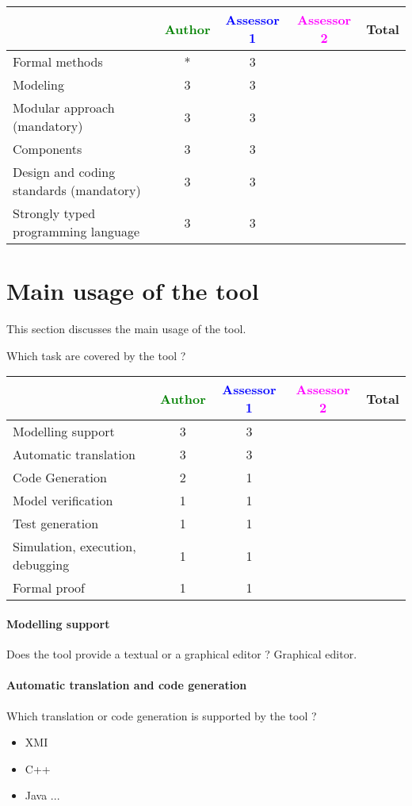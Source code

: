 \begin{tabular}{|l | c | c | c | c|}
\hline
& \textcolor{green}{Author} & \textcolor{blue}{Assessor 1} & \textcolor{magenta}{Assessor 2} & Total \\
\hline
Formal methods  &* & 3& &  \\
\hline 
Modeling  &3 & 3& &  \\
\hline
Modular approach (mandatory) &3 & 3& &  \\
\hline
Components &3 & 3& &  \\
\hline
Design and coding standards (mandatory) &3 & 3& &  \\
\hline
Strongly typed programming language &3 & 3& &  \\
\hline

\end{tabular}



\section{Main usage of the tool}
\label{main_usage}

This section discusses the main usage of the tool.

Which task are covered by the tool ?


\begin{tabular}{|l | c | c | c | c|}
\hline
& \textcolor{green}{Author} & \textcolor{blue}{Assessor 1} & \textcolor{magenta}{Assessor 2} & Total \\
\hline 
Modelling support &3 & 3& &  \\
\hline
Automatic translation  &3 & 3& & \\
\hline
Code Generation  &2 & 1& & \\
\hline
Model verification &1 & 1& & \\
\hline
Test generation &1 & 1& & \\
\hline
Simulation, execution, debugging &1 & 1& & \\
\hline
Formal proof &1 & 1& & \\
\hline
\end{tabular}

\paragraph{Modelling support}
Does the tool provide a  textual or a graphical editor ? Graphical editor.

\paragraph{Automatic translation and code generation}
Which translation or code generation is supported by the tool ?
\begin{itemize}
\item XMI
\item C++
\item Java ...
\end{itemize}
